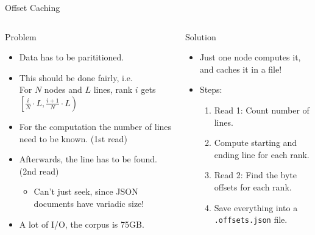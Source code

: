 \documentclass[compress,aspectratio=169]{beamer}
\begin{document}
  \begin{frame}{Offset Caching}
    \begin{columns}
      \begin{column}{0.5\textwidth}
        \begin{block}{Problem}
          \begin{itemize}
            \item Data has to be parititioned.
              \pause
            \item This should be done fairly, i.e.\\
              For $N$ nodes and $L$ lines, rank $i$ gets\\
               $\left[ \frac{i}{N} \cdot L, \frac{i+1}{N} \cdot L \right)$
               \pause
            \item For the computation the number of lines need to be known. (1st read)
              \pause
            \item Afterwards, the line has to be found. (2nd read)
              \begin{itemize}
                \item Can't just seek, since JSON documents have variadic size!
              \end{itemize}
              \pause
            \item A lot of I/O, the corpus is 75GB.
          \end{itemize}
        \end{block}
      \end{column}
      \pause
      \begin{column}{0.5\textwidth}
        \begin{block}{Solution}
          \begin{itemize}
            \item Just one node computes it, and caches it in a file!
              \pause
            \item Steps:
              \begin{enumerate}
                \item Read 1: Count number of lines.
                \item Compute starting and ending line for each rank.
                \item Read 2: Find the byte offsets for each rank.
                \item Save everything into a \texttt{.offsets.json} file.
              \end{enumerate}
          \end{itemize}
        \end{block}
      \end{column}
    \end{columns}
  \end{frame}
\end{document}
